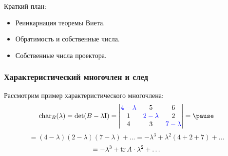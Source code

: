 
\begin{frame} %


\end{frame}



\begin{frame}{Краткий план:}
  \begin{itemize}[<+->]
    \item Реинкарнация теоремы Виета. 
    \item Обратимость и собственные числа.
    \item Собственные числа проектора.
  \end{itemize}

\end{frame}



\begin{frame}
    \frametitle{Характеристический многочлен и след}

Рассмотрим пример характеристического многочлена:
\[
\charp_B(\lambda) = \det(B -\lambda\Id) = \begin{vmatrix}
    \blue{4 - \lambda} & 5 & 6 \\
    1 & \blue{2 - \lambda} & 2 \\
    4 & 3 & \blue{7 -\lambda} \\
\end{vmatrix} =   \pause
\]
\[
= (4-\lambda)(2-\lambda)(7-\lambda) + \ldots = -\lambda^3 + \lambda^2 ( 4 + 2 + 7) + \ldots    
\]
\pause
\[
= -\lambda^3 + \trace A \cdot \lambda^2 + \ldots    
\]

\end{frame}



